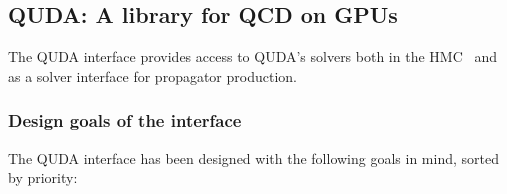
\subsection{QUDA: A library for QCD on GPUs}\label{subsec:quda}


The QUDA \cite{Clark:2009wm, Babich:2011np, Strelchenko:2013vaa} interface provides access to QUDA's solvers both in the HMC~\cite{Kostrzewa:2022hsv} and as a solver interface for propagator production.

\subsubsection{Design goals of the interface}
The QUDA interface has been designed with the following goals in mind, sorted by priority:
